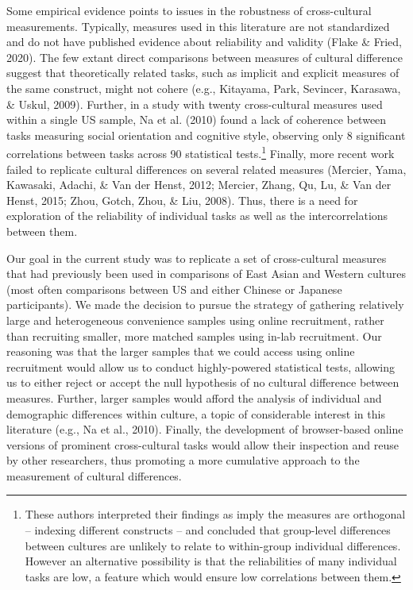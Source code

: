 \documentclass[
  man,floatsintext]{apa6}
\begin{document}
Some empirical evidence points to issues in the robustness of cross-cultural measurements. Typically, measures used in this literature are not standardized and do not have published evidence about reliability and validity (Flake \& Fried, 2020). The few extant direct comparisons between measures of cultural difference suggest that theoretically related tasks, such as implicit and explicit measures of the same construct, might not cohere (e.g., Kitayama, Park, Sevincer, Karasawa, \& Uskul, 2009). Further, in a study with twenty cross-cultural measures used within a single US sample, Na et al. (2010) found a lack of coherence between tasks measuring social orientation and cognitive style, observing only 8 significant correlations between tasks across 90 statistical tests.\footnote{These authors interpreted their findings as imply the measures are orthogonal -- indexing different constructs -- and concluded that group-level differences between cultures are unlikely to relate to within-group individual differences. However an alternative possibility is that the reliabilities of many individual tasks are low, a feature which would ensure low correlations between them.} Finally, more recent work failed to replicate cultural differences on several related measures (Mercier, Yama, Kawasaki, Adachi, \& Van der Henst, 2012; Mercier, Zhang, Qu, Lu, \& Van der Henst, 2015; Zhou, Gotch, Zhou, \& Liu, 2008). Thus, there is a need for exploration of the reliability of individual tasks as well as the intercorrelations between them.

Our goal in the current study was to replicate a set of cross-cultural measures that had previously been used in comparisons of East Asian and Western cultures (most often comparisons between US and either Chinese or Japanese participants). We made the decision to pursue the strategy of gathering relatively large and heterogeneous convenience samples using online recruitment, rather than recruiting smaller, more matched samples using in-lab recruitment. Our reasoning was that the larger samples that we could access using online recruitment would allow us to conduct highly-powered statistical tests, allowing us to either reject or accept the null hypothesis of no cultural difference between measures. Further, larger samples would afford the analysis of individual and demographic differences within culture, a topic of considerable interest in this literature (e.g., Na et al., 2010). Finally, the development of browser-based online versions of prominent cross-cultural tasks would allow their inspection and reuse by other researchers, thus promoting a more cumulative approach to the measurement of cultural differences.
\end{document}
